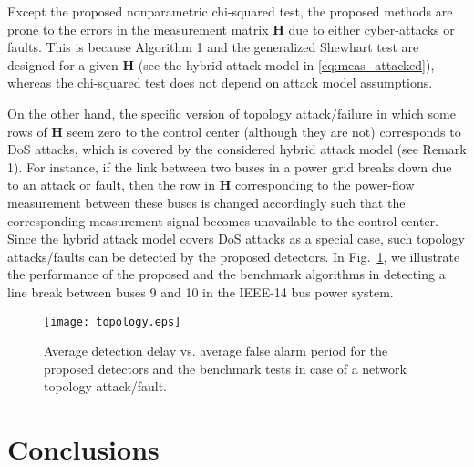 \documentclass[onecolumn]{IEEEtran}
\begin{document}
{
Except the proposed nonparametric chi-squared test, the proposed methods are prone to the errors in the measurement matrix $\mathbf{H}$ due to either cyber-attacks or faults. This is because Algorithm 1 and the generalized Shewhart test are designed for a given $\mathbf{H}$ (see the hybrid attack model in \eqref{eq:meas_attacked}), whereas the chi-squared test does not depend on attack model assumptions.}

{
On the other hand, the specific version of topology attack/failure in which some rows of $\mathbf{H}$ seem zero to the control center (although they are not) corresponds to DoS attacks, which is covered by the considered hybrid attack model (see Remark 1). For instance, if the link between two buses in a power grid breaks down due to an attack or fault, then the row in $\mathbf{H}$ corresponding to the power-flow measurement between these buses is changed accordingly such that the corresponding measurement signal becomes unavailable to the control center. Since the hybrid attack model covers DoS attacks as a special case, such topology attacks/faults can be detected by the proposed detectors. In Fig.~\ref{fig:topology}, we illustrate the performance of the proposed and the benchmark algorithms in detecting a line break between buses 9 and 10 in the IEEE-14 bus power system.}

\begin{figure}
\center
  \texttt{[image: topology.eps]}
\caption{{Average detection delay vs. average false alarm period for the proposed detectors and the benchmark tests in case of a network topology attack/fault.}}
 \label{fig:topology}
\end{figure}



\section{Conclusions} \label{sec:conc}
\end{document}

